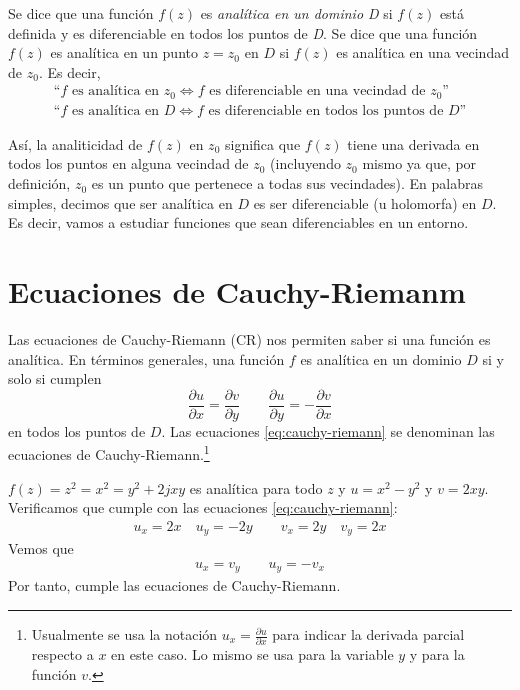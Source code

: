 Se dice que una función $f(z)$ es \textit{analítica en un dominio D} si $f(z)$ está definida y es diferenciable en todos los puntos de \textit{D}. Se dice que una función $f(z)$ es analítica en un punto $z=z_0$ en $D$ si $f(z)$ es analítica en una vecindad de $z_0$. Es decir, 
\begin{gather*}
  \text{``}f \text{ es analítica en }z_0 \Leftrightarrow f \text{ es diferenciable en una vecindad de }z_0\text{''} \\ 
  \text{``}f \text{ es analítica en }D \Leftrightarrow f \text{ es diferenciable en todos los puntos de }D\text{''}
\end{gather*}

Así, la analiticidad de $f(z)$ en $z_0$ significa que $f(z)$ tiene una derivada en todos los puntos en alguna vecindad de $z_0$ (incluyendo $z_0$ mismo ya que, por definición, $z_0$ es un punto que pertenece a todas sus vecindades). En palabras simples, decimos que ser analítica en $D$ es ser diferenciable (u holomorfa) en $D$. Es decir, vamos a estudiar funciones que sean diferenciables en un entorno.

\section{Ecuaciones de Cauchy-Riemanm}

Las ecuaciones de Cauchy-Riemann (CR) nos permiten saber si una función es analítica. En términos generales, una función $f$ es analítica en un dominio $D$ si y solo si cumplen
\begin{equation}
  \frac{\partial u}{\partial x} = \frac{\partial v}{\partial y} \qquad \frac{\partial u}{\partial y} = -\frac{\partial v}{\partial x}
  \label{eq:cauchy-riemann}
\end{equation}
en todos los puntos de $D$. Las ecuaciones \ref{eq:cauchy-riemann} se denominan las ecuaciones de Cauchy-Riemann.\footnote{Usualmente se usa la notación $u_x=\frac{\partial u}{\partial x}$ para indicar la derivada parcial respecto a $x$ en este caso. Lo mismo se usa para la variable $y$ y para la función $v$.}

\begin{example}
  $f(z)=z^2=x^2=y^2+2jxy$ es analítica para todo $z$ y $u=x^2-y^2$ y $v=2xy$. Verificamos que cumple con las ecuaciones \ref{eq:cauchy-riemann}:
  \begin{gather*}
    u_x = 2x \quad u_y = -2y \qquad v_x = 2y \quad v_y = 2x
  \end{gather*}
  Vemos que
  \begin{align*}
    u_x = v_y \qquad u_y = -v_x
  \end{align*}
  Por tanto, cumple las ecuaciones de Cauchy-Riemann.
\end{example}

